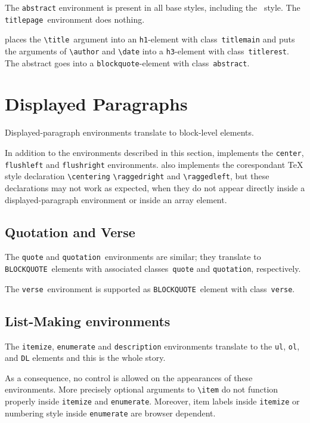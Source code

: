 The \verb+abstract+ environment is present in all base styles,
including the ~style.  The \verb+titlepage+~environment
does nothing.

\hevea{} places the \verb+\title+~argument into an \verb+h1+-element
with class~\verb+titlemain+ and puts the arguments of \verb+\author+
and \verb+\date+ into a \verb+h3+-element with class~\verb+titlerest+.
The abstract goes into a \verb+blockquote+-element with
class~\verb+abstract+.


\section{Displayed Paragraphs}
Displayed-paragraph environments translate to block-level
elements.

In addition to the environments described in this section,
\hevea{} implements the \verb+center+, \verb+flushleft+ and
\verb+flushright+ environments.
\hevea{} also implements the corespondant \TeX{} style declaration
\verb+\centering+ \verb+\raggedright+ and \verb+\raggedleft+,
but these declarations may not work as expected, when they do not
appear directly inside a displayed-paragraph environment or inside an array
element.


\subsection{Quotation and Verse}

The \verb+quote+ and \verb+quotation+~environments are similar; they
translate to \verb+BLOCKQUOTE+~elements with associated
classes~\verb+quote+ and \verb+quotation+, respectively.

The \verb+verse+~environment is supported as \verb+BLOCKQUOTE+~element
with class~\verb+verse+.


\subsection{List-Making environments}

The \verb+itemize+, \verb+enumerate+ and \verb+description+
environments translate to the \verb+ul+, \verb+ol+, and
\verb+DL+ elements and this is the whole story.

As a consequence, no control is allowed on the appearances of these
environments.  More precisely optional arguments to \verb+\item+ do not
function properly inside \verb+itemize+ and \verb+enumerate+.  Moreover, item
labels inside \verb+itemize+ or numbering style inside \verb+enumerate+
are browser dependent.

